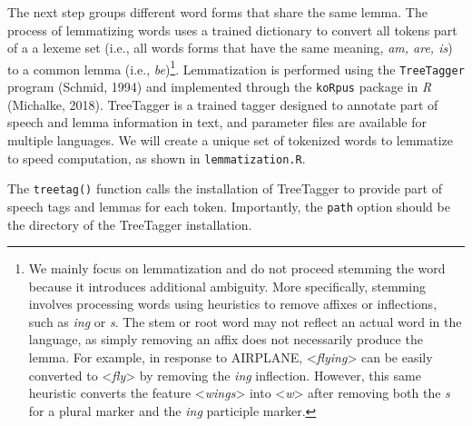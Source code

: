 \documentclass[man]{apa6}
\newenvironment{Shaded}{\begin{snugshade}}{\end{snugshade}}
\newcommand{\CommentTok}[1]{\textcolor[rgb]{0.56,0.35,0.01}{\textit{#1}}}
\newcommand{\DataTypeTok}[1]{\textcolor[rgb]{0.13,0.29,0.53}{#1}}
\newcommand{\KeywordTok}[1]{\textcolor[rgb]{0.13,0.29,0.53}{\textbf{#1}}}
\newcommand{\NormalTok}[1]{#1}
\newcommand{\OperatorTok}[1]{\textcolor[rgb]{0.81,0.36,0.00}{\textbf{#1}}}
\newcommand{\StringTok}[1]{\textcolor[rgb]{0.31,0.60,0.02}{#1}}
\let\rmarkdownfootnote\footnote%
\def\footnote{\protect\rmarkdownfootnote}
\begin{document}
The next step groups different word forms that share the same lemma. The process of lemmatizing words uses a trained dictionary to convert all tokens part of a a lexeme set (i.e., all words forms that have the same meaning, \emph{am, are, is}) to a common lemma (i.e., \emph{be})\footnote{We mainly focus on lemmatization and do not proceed stemming the word because it introduces additional ambiguity. More specifically, stemming involves processing words using heuristics to remove affixes or inflections, such as \emph{ing} or \emph{s}. The stem or root word may not reflect an actual word in the language, as simply removing an affix does not necessarily produce the lemma. For example, in response to AIRPLANE, \textless{}\emph{flying}\textgreater{} can be easily converted to \textless{}\emph{fly}\textgreater{} by removing the \emph{ing} inflection. However, this same heuristic converts the feature \textless{}\emph{wings}\textgreater{} into \textless{}\emph{w}\textgreater{} after removing both the \emph{s} for a plural marker and the \emph{ing} participle marker.}. Lemmatization is performed using the \texttt{TreeTagger} program (Schmid, 1994) and implemented through the \texttt{koRpus} package in \emph{R} (Michalke, 2018). TreeTagger is a trained tagger designed to annotate part of speech and lemma information in text, and parameter files are available for multiple languages. We will create a unique set of tokenized words to lemmatize to speed computation, as shown in \texttt{lemmatization.R}.

\scriptsize

\begin{Shaded}
\end{Shaded}

\normalsize

The \texttt{treetag()} function calls the installation of TreeTagger to provide part of speech tags and lemmas for each token. Importantly, the \texttt{path} option should be the directory of the TreeTagger installation.
\end{document}
